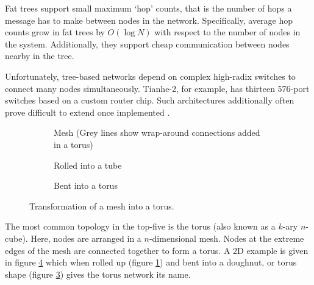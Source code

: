 				Fat trees support small maximum `hop' counts, that is the number of hops
				a message has to make between nodes in the network. Specifically,
				average hop counts grow in fat trees by $O(\log{N})$ with respect to the
				number of nodes in the system. Additionally, they support cheap
				communication between nodes nearby in the tree.
				
				Unfortunately, tree-based networks depend on complex high-radix switches
				to connect many nodes simultaneously.  Tianhe-2, for example, has
				thirteen 576-port switches based on a custom router chip. Such
				architectures additionally often prove difficult to extend once
				implemented \cite{dally04}.
				
				\begin{figure}
					\begin{subfigure}[t]{\textwidth}
						\center
						
						\caption{Mesh (Grey lines show wrap-around connections added in a
						torus)}
						\label{fig:torus-flat}
					\end{subfigure}
					
					\vspace{1em}
					
					\begin{subfigure}[t]{\textwidth}
						\center
						
						\caption{Rolled into a tube}
						\label{fig:torus-pipe}
					\end{subfigure}
					
					\vspace{1em}
					
					\begin{subfigure}[t]{\textwidth}
						\center
						
						\caption{Bent into a torus}
						\label{fig:torus-3D}
					\end{subfigure}
					
					\caption{Transformation of a mesh into a torus.}
					\label{fig:forming-a-torus}
				\end{figure}
			
				The most common topology in the top-five is the torus (also known as a
				$k$-ary $n$-cube). Here, nodes are arranged in a $n$-dimensional mesh.
				Nodes at the extreme edges of the mesh are connected together to form a
				torus. A 2D example is given in figure \ref{fig:forming-a-torus} which
				when rolled up (figure \ref{fig:torus-flat}) and bent into a doughnut,
				or torus shape (figure \ref{fig:torus-3D}) gives the torus network its
				name.
				
